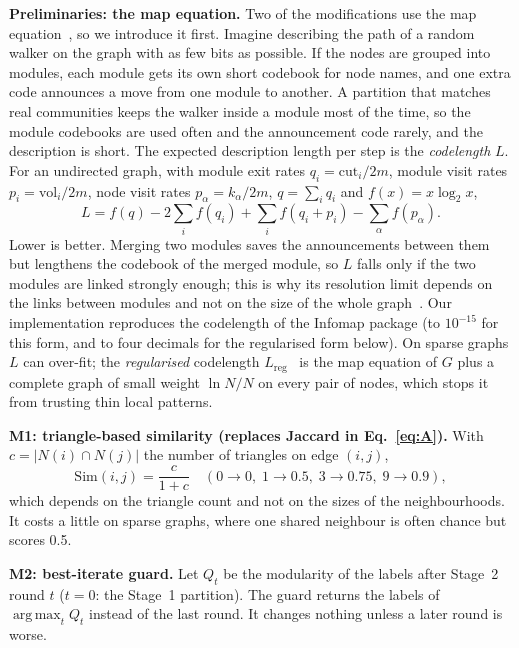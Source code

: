 \documentclass[conference]{IEEEtran}
\DeclareMathOperator*{\argmax}{arg\,max}
\begin{document}
\textbf{Preliminaries: the map equation.} Two of the modifications use the map equation~\cite{rosvall2008}, so we introduce it first. Imagine describing the path of a random walker on the graph with as few bits as possible. If the nodes are grouped into modules, each module gets its own short codebook for node names, and one extra code announces a move from one module to another. A partition that matches real communities keeps the walker inside a module most of the time, so the module codebooks are used often and the announcement code rarely, and the description is short. The expected description length per step is the \emph{codelength} $L$. For an undirected graph, with module exit rates $q_i=\mathrm{cut}_i/2m$, module visit rates $p_i=\mathrm{vol}_i/2m$, node visit rates $p_\alpha=k_\alpha/2m$, $q=\sum_iq_i$ and $f(x)=x\log_2x$,
\begin{equation}
L=f(q)-2\sum_if(q_i)+\sum_if(q_i+p_i)-\sum_\alpha f(p_\alpha).\label{eq:L}
\end{equation}
Lower is better. Merging two modules saves the announcements between them but lengthens the codebook of the merged module, so $L$ falls only if the two modules are linked strongly enough; this is why its resolution limit depends on the links between modules and not on the size of the whole graph~\cite{kawamoto2015}. Our implementation reproduces the codelength of the Infomap package (to $10^{-15}$ for this form, and to four decimals for the regularised form below). On sparse graphs $L$ can over-fit; the \emph{regularised} codelength $L_{\mathrm{reg}}$~\cite{smiljanic2020} is the map equation of $G$ plus a complete graph of small weight $\ln N/N$ on every pair of nodes, which stops it from trusting thin local patterns.

\textbf{M1: triangle-based similarity (replaces Jaccard in Eq.~\eqref{eq:A}).} With $c=|N(i)\cap N(j)|$ the number of triangles on edge $(i,j)$,
\begin{equation}
\mathrm{Sim}(i,j)=\frac{c}{1+c}\quad(0\to0,\;1\to0.5,\;3\to0.75,\;9\to0.9),\label{eq:motif}
\end{equation}
which depends on the triangle count and not on the sizes of the neighbourhoods. It costs a little on sparse graphs, where one shared neighbour is often chance but scores 0.5.

\textbf{M2: best-iterate guard.} Let $Q_t$ be the modularity of the labels after Stage~2 round $t$ ($t=0$: the Stage~1 partition). The guard returns the labels of $\argmax_tQ_t$ instead of the last round. It changes nothing unless a later round is worse.
\end{document}
